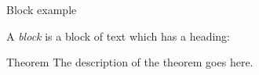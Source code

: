 \begin{frame}{Block example}

  A \textit{block} is a block of text which has a heading:

  \begin{block}{Theorem}
    The description of the theorem goes here.
  \end{block}

\end{frame}